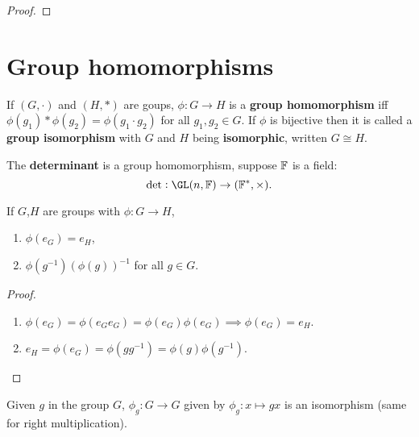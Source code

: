 \documentclass[../Year1/Year1.tex]{subfiles}
\begin{document}
\begin{proof}
    
\end{proof}

\section{Group homomorphisms}

\begin{definition}
    If $(G,\cdot)$ and $(H,\ast)$ are goups, $\phi:G\rightarrow H$ is a \textbf{group homomorphism} iff $\phi(g_1)\ast\phi(g_2) = \phi(g_1\cdot g_2)$ for all $g_1,g_2\in G$. If $\phi$ is bijective then it is called a \textbf{group isomorphism} with $G$ and $H$ being \textbf{isomorphic}, written $G\cong H$.
\end{definition}

\begin{example}[determinant]
    The \textbf{determinant} is a group homomorphism, suppose $\mathbb{F}$ is a field:\[
    \det: \GL(n,\FF)\rightarrow(\FF^*,\times)
    \textcolor{black}{.}
    \]
\end{example}

\vspace{-30pt}

\begin{lemma}
    If $G$,$H$ are groups with $\phi:G\rightarrow H$, \begin{enumerate}
        \item $\phi(e_G) = e_H$,
        \item $\phi(g^{-1}) {(\phi(g))}^{-1}$ for all $g\in G$.
    \end{enumerate}
\end{lemma}

\begin{proof}
    \begin{enumerate}
        \item $\phi(e_G)=\phi(e_G e_G)=\phi(e_G)\phi(e_G)\implies \phi(e_G)=e_H$. 
        \item $e_H=\phi(e_G)=\phi(gg^{-1})=\phi(g)\phi(g^{-1})$.\vspace{-15pt}
    \end{enumerate}
\end{proof}

\begin{lemma}\label{bijection from element}
    Given $g$ in the group $G$, $\phi_g:G\rightarrow G$ given by $\phi_g:x\mapsto gx$ is an isomorphism (same for right multiplication).
\end{lemma}
\end{document}

